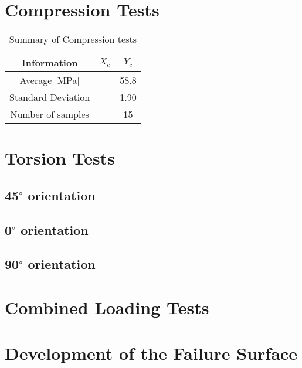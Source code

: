 \documentclass[main.tex]{subfiles}
\begin{document}
\section{Compression Tests} \label{sec:compr}
\begin{table} [h]
	\centering
	\caption{Summary of Compression tests}
	\begin{tabular}{ c| c c } 
		\toprule
		\textbf{Information} & $X_c$ & $Y_c$\\
		\midrule
		Average [MPa] &  & 58.8\\
		Standard Deviation &  & 1.90\\
		Number of samples &  & 15\\
		\bottomrule
	\end{tabular}
\label{tab:comprtab}
\end{table}

\section{Torsion Tests} \label{sec:torsr}
\subsection{45$^\circ$ orientation} \label{ssec:45r}
\subsection{0$^\circ$ orientation} \label{ssec:0r}
\subsection{90$^\circ$ orientation} \label{ssec:90r}
\section{Combined Loading Tests} \label{sec:clr}
\section{Development of the Failure Surface} \label{sec:fsc}

\end{document}

